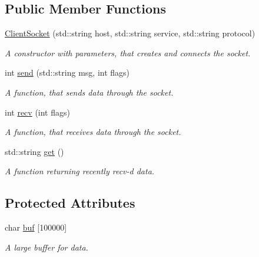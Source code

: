 \subsection*{Public Member Functions}
\begin{DoxyCompactItemize}
\item 
\hyperlink{class_net_socket_p_p_1_1_client_socket_a18798784dff930fd46bf9d89c021425f}{Client\-Socket} (std\-::string host, std\-::string service, std\-::string protocol)
\begin{DoxyCompactList}\small\item\em A constructor with parameters, that creates and connects the socket. \end{DoxyCompactList}\item 
int \hyperlink{class_net_socket_p_p_1_1_client_socket_a1317645d6afb05c46abbb3b62e75c86a}{send} (std\-::string msg, int flags)
\begin{DoxyCompactList}\small\item\em A function, that sends data through the socket. \end{DoxyCompactList}\item 
int \hyperlink{class_net_socket_p_p_1_1_client_socket_aa2761de701972e2dbda39919d83c9467}{recv} (int flags)
\begin{DoxyCompactList}\small\item\em A function, that receives data through the socket. \end{DoxyCompactList}\item 
std\-::string \hyperlink{class_net_socket_p_p_1_1_client_socket_ae32fa1faac049522fd1f1f7760936370}{get} ()
\begin{DoxyCompactList}\small\item\em A function returning recently recv-\/d data. \end{DoxyCompactList}\end{DoxyCompactItemize}
\subsection*{Protected Attributes}
\begin{DoxyCompactItemize}
\item 
\hypertarget{class_net_socket_p_p_1_1_client_socket_a8b1405dc86b43d907a6a37d859a3eae9}{char \hyperlink{class_net_socket_p_p_1_1_client_socket_a8b1405dc86b43d907a6a37d859a3eae9}{buf} \mbox{[}100000\mbox{]}}\label{class_net_socket_p_p_1_1_client_socket_a8b1405dc86b43d907a6a37d859a3eae9}

\begin{DoxyCompactList}\small\item\em A large buffer for data. \end{DoxyCompactList}\end{DoxyCompactItemize}
